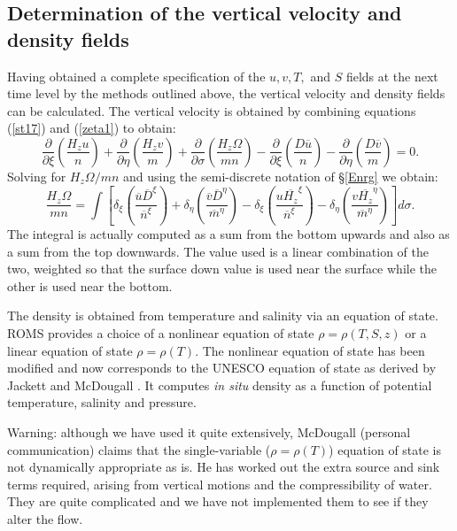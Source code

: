 \subsection{Determination of the vertical velocity and density fields}
\label{EOS}
Having obtained a complete specification of the $u,v,T,$ and $S$ fields
at the next time level by the methods outlined above, the vertical
velocity and density fields can be calculated.  The vertical velocity
is obtained by combining equations (\ref{st17}) and (\ref{zeta1}) to
obtain:
\begin{equation}
   \frac{\partial}{\partial \xi} \left( \frac{H_z u}{n} \right) +
   \frac{\partial}{\partial \eta} \left( \frac{H_z v}{m} \right) +
   \frac{\partial}{\partial \sigma}\left( \frac{H_z \Omega}{mn} \right)
   - \frac{\partial}{\partial \xi} \left( \frac{D \overline{u}}{n}
   \right) -
   \frac{\partial}{\partial \eta} \left( \frac{D \overline{v}}{m}
   \right)  = 0 .
\label{zeta2}
\end{equation}
Solving for $H_z \Omega / mn$ and using the semi-discrete notation of
\S\ref{Enrg} we obtain:
\begin{equation}
   \frac{H_z \Omega}{mn} =  \int  \left[
   \delta_{\xi} \left( \frac{\overline{u} \overline{D}^{\xi}}
   {\overline{n}^{\xi}} \right) +
   \delta_{\eta} \left( \frac{\overline{v} \overline{D}^{\eta}}
   {\overline{m}^{\eta}} \right) -
   \delta_{\xi} \left( \frac{u \overline{H_z}^{\xi}}
   {\overline{n}^{\xi}} \right) - 
   \delta_{\eta} \left( \frac{v \overline{H_z}^{\eta}}
   {\overline{m}^{\eta}} \right)  \right] d\sigma .
\label{omega}
\end{equation}
The integral is actually computed as a sum from the bottom upwards and
also as a sum from the top downwards.  The value used is a linear
combination of the two, weighted so that the surface down value is used
near the surface while the other is used near the bottom.

The density is obtained from temperature and salinity via an
equation of state.  ROMS provides a choice of a nonlinear equation
of state $\rho = \rho(T,S,z)$ or a linear equation of state $\rho =
\rho(T)$.  The nonlinear equation of state has been modified and now
corresponds to the UNESCO equation of state as derived by Jackett and
McDougall \cite{Jackett}.  It computes {\sl in situ} density as a
function of potential temperature, salinity and pressure.

Warning: although we have used it quite extensively, McDougall
(personal communication) claims that the single-variable ($\rho =
\rho(T)$) equation of state is not dynamically appropriate as is.
He has worked out the extra source and sink terms required, arising
from vertical motions and the compressibility of water.  They are
quite complicated and we have not implemented them to see if they
alter the flow.

